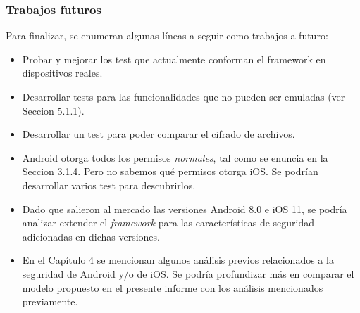 \begin{frame}
 \frametitle{Trabajos futuros}
Para finalizar, se enumeran algunas líneas a seguir como trabajos a futuro:\pause
 \begin{small}
 \begin{itemize}[<+->]
    \item Probar y mejorar los test que actualmente conforman el framework en dispositivos reales.
    \item Desarrollar tests para las funcionalidades que no pueden ser emuladas (ver Seccion 5.1.1).
    \item Desarrollar un test para poder comparar el cifrado de archivos.
    \item Android otorga todos los permisos \emph{normales}, tal como se enuncia en la Seccion 3.1.4. Pero no sabemos qué permisos otorga iOS. Se podrían desarrollar varios test para descubrirlos.
    \item Dado que salieron al mercado las versiones Android 8.0 e iOS 11, se podría analizar extender el \emph{framework} para las características de seguridad adicionadas en dichas versiones.
    \item En el Capítulo 4 se mencionan algunos análisis previos relacionados a la seguridad de Android y/o de iOS. Se podría profundizar más en comparar el modelo propuesto en el presente informe con los análisis mencionados previamente.
 \end{itemize}
 \end{small}
\end{frame}

